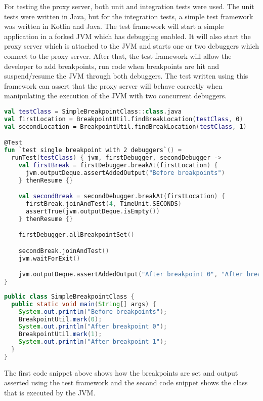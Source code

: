 \documentclass[..thesis.tex]{subfiles}
\begin{document}
For testing the proxy server, both unit and integration tests were used.
The unit tests were written in Java, but for the integration tests, a simple test framework was written in Kotlin and Java.
The test framework will start a simple application in a forked JVM which has debugging enabled.
It will also start the proxy server which is attached to the JVM and starts one or two debuggers which connect to the proxy server.
After that, the test framework will allow the developer to add breakpoints, run code when breakpoints are hit and suspend/resume the JVM through both debuggers.
The test written using this framework can assert that the proxy server will behave correctly when manipulating the execution of the JVM with two concurrent debuggers.

\begin{lstlisting}[language=Kotlin]
val testClass = SimpleBreakpointClass::class.java
val firstLocation = BreakpointUtil.findBreakLocation(testClass, 0)
val secondLocation = BreakpointUtil.findBreakLocation(testClass, 1)

@Test
fun `test single breakpoint with 2 debuggers`() = 
  runTest(testClass) { jvm, firstDebugger, secondDebugger ->
    val firstBreak = firstDebugger.breakAt(firstLocation) {
      jvm.outputDeque.assertAddedOutput("Before breakpoints")
    } thenResume {}

    val secondBreak = secondDebugger.breakAt(firstLocation) {
      firstBreak.joinAndTest(4, TimeUnit.SECONDS)
      assertTrue(jvm.outputDeque.isEmpty())
    } thenResume {}

    firstDebugger.allBreakpointSet()

    secondBreak.joinAndTest()
    jvm.waitForExit()

    jvm.outputDeque.assertAddedOutput("After breakpoint 0", "After breakpoint 1")
}
\end{lstlisting}

\begin{lstlisting}[language=Java]
public class SimpleBreakpointClass {
  public static void main(String[] args) {
    System.out.println("Before breakpoints");
    BreakpointUtil.mark(0);
    System.out.println("After breakpoint 0");
    BreakpointUtil.mark(1);
    System.out.println("After breakpoint 1");
  }
}
\end{lstlisting}

The first code snippet above shows how the breakpoints are set and output asserted using the test framework and the second code snippet shows the class that is executed by the JVM.
\end{document}

